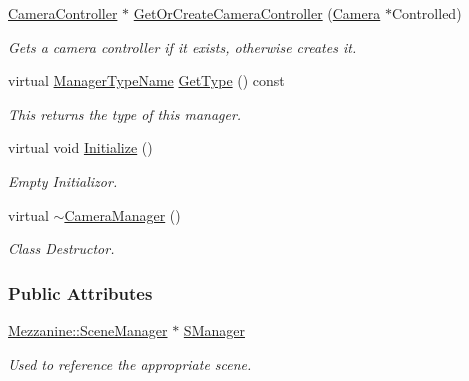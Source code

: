 \begin{DoxyCompactItemize}
\hyperlink{classMezzanine_1_1CameraController}{CameraController} $\ast$ \hyperlink{classMezzanine_1_1CameraManager_a2749012cb337dd5aa1f784c951fc9e56}{GetOrCreateCameraController} (\hyperlink{classMezzanine_1_1Camera}{Camera} $\ast$Controlled)
\begin{DoxyCompactList}\small\item\em Gets a camera controller if it exists, otherwise creates it. \item\end{DoxyCompactList}\item 
virtual \hyperlink{classMezzanine_1_1ManagerBase_a08cecf5169cad3e82be81a3a159b0b6e}{ManagerTypeName} \hyperlink{classMezzanine_1_1CameraManager_a1eb75dabfd7df1c901432d841a92fcbc}{GetType} () const 
\begin{DoxyCompactList}\small\item\em This returns the type of this manager. \item\end{DoxyCompactList}\item 
virtual void \hyperlink{classMezzanine_1_1CameraManager_a4b7f0d25f77306bca4b5c885e35363cc}{Initialize} ()
\begin{DoxyCompactList}\small\item\em Empty Initializor. \item\end{DoxyCompactList}\item 
virtual \hyperlink{classMezzanine_1_1CameraManager_a1aad56c3d298c86bde95c26ce231697f}{$\sim$CameraManager} ()
\begin{DoxyCompactList}\small\item\em Class Destructor. \item\end{DoxyCompactList}\end{DoxyCompactItemize}
\subsubsection*{Public Attributes}
\begin{DoxyCompactItemize}
\item 
\hypertarget{classMezzanine_1_1CameraManager_a384babc63ab516b26e0e5d45ea525ced}{
\hyperlink{classMezzanine_1_1SceneManager}{Mezzanine::SceneManager} $\ast$ \hyperlink{classMezzanine_1_1CameraManager_a384babc63ab516b26e0e5d45ea525ced}{SManager}}
\label{classMezzanine_1_1CameraManager_a384babc63ab516b26e0e5d45ea525ced}

\begin{DoxyCompactList}\small\item\em Used to reference the appropriate scene. \item\end{DoxyCompactList}\end{DoxyCompactItemize}
